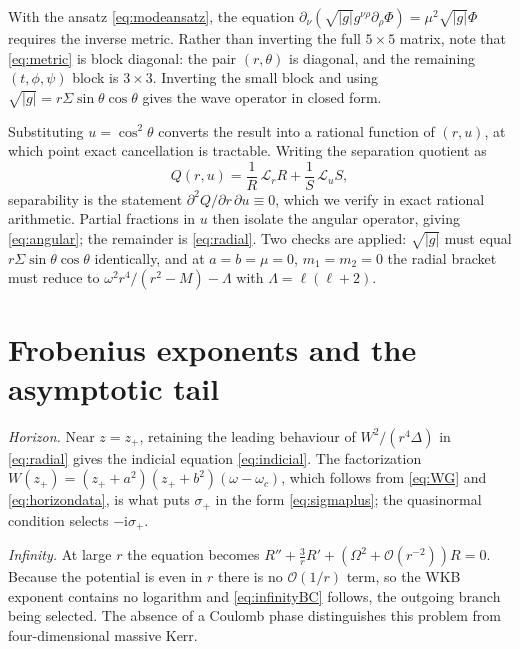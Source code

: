 \documentclass[aps,prd,reprint,superscriptaddress,nofootinbib,longbibliography]{revtex4-2}
\theoremstyle{plain}
\theoremstyle{definition}
\theoremstyle{remark}
\newcommand{\ii}{\mathrm{i}}
\newcommand{\Ord}{\mathcal{O}}
\begin{document}
With the ansatz \eqref{eq:modeansatz}, the equation
$\partial_\nu(\sqrt{|g|}g^{\nu\rho}\partial_\rho\Phi)=\mu^2\sqrt{|g|}\Phi$
requires the inverse metric. Rather than inverting the full $5\times5$ matrix,
note that \eqref{eq:metric} is block diagonal: the pair $(r,\theta)$ is
diagonal, and the remaining $(t,\phi,\psi)$ block is $3\times3$. Inverting the
small block and using $\sqrt{|g|}=r\Sigma\sin\theta\cos\theta$ gives the wave
operator in closed form.

Substituting $u=\cos^2\!\theta$ converts the result into a rational function of
$(r,u)$, at which point exact cancellation is tractable. Writing the separation
quotient as
\begin{equation}\label{eq:sepquotient}
  Q(r,u)=\frac1R\,\mathcal{L}_rR+\frac1S\,\mathcal{L}_uS,
\end{equation}
separability is the statement $\partial^2Q/\partial r\,\partial u\equiv0$, which
we verify in exact rational arithmetic. Partial fractions in $u$ then isolate
the angular operator, giving \eqref{eq:angular}; the remainder is
\eqref{eq:radial}. Two checks are applied: $\sqrt{|g|}$ must equal
$r\Sigma\sin\theta\cos\theta$ identically, and at $a=b=\mu=0$, $m_1=m_2=0$ the
radial bracket must reduce to $\omega^2r^4/(r^2-M)-\Lambda$ with
$\Lambda=\ell(\ell+2)$.

\section{Frobenius exponents and the asymptotic tail}\label{app:frobenius}

\emph{Horizon.} Near $z=z_+$, retaining the leading behaviour of
$W^2/(r^4\Delta)$ in \eqref{eq:radial} gives the indicial equation
\eqref{eq:indicial}. The factorization
$W(z_+)=(z_++a^2)(z_++b^2)(\omega-\omega_c)$, which follows from \eqref{eq:WG}
and \eqref{eq:horizondata}, is what puts $\sigma_+$ in the form
\eqref{eq:sigmaplus}; the quasinormal condition selects $-\ii\sigma_+$.

\emph{Infinity.} At large $r$ the equation becomes
$R''+\tfrac3rR'+(\Omega^2+\Ord(r^{-2}))R=0$. Because the potential is even in
$r$ there is no $\Ord(1/r)$ term, so the WKB exponent contains no logarithm and
\eqref{eq:infinityBC} follows, the outgoing branch being selected. The absence
of a Coulomb phase distinguishes this problem from four-dimensional massive
Kerr.
\end{document}
